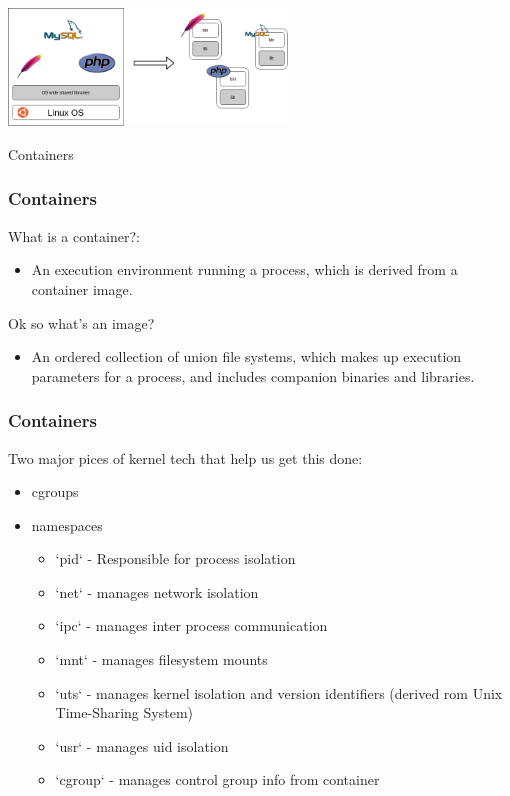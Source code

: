 \documentclass[11pt]{beamer}
\begin{document}
\begin{frame}
  \begin{center}
    \includegraphics[width=280px,keepaspectratio]{BNW}
  \end{center}
\end{frame}

\begin{frame}
  \begin{center}
    Containers
  \end{center}
\end{frame}

\begin{frame}
  \frametitle{Containers}
  What is a container?:
  \begin{itemize}
    \item An execution environment running a process, which is derived from a container image.
  \end{itemize}
  Ok so what's an image?
  \begin{itemize}
    \item An ordered collection of union file systems, which makes up execution parameters for a process, and includes companion binaries and libraries.
  \end{itemize}
\end{frame}

\begin{frame}
  \frametitle{Containers}
  Two major pices of kernel tech that help us get this done:
  \begin{itemize}
    \item cgroups
    \item namespaces
    \begin{itemize}
      \item `pid` - Responsible for process isolation
      \item `net` - manages network isolation
      \item `ipc` - manages inter process communication
      \item `mnt` - manages filesystem mounts
      \item `uts` - manages kernel isolation and version identifiers (derived rom Unix Time-Sharing System)
      \item `usr` - manages uid isolation
      \item `cgroup` - manages control group info from container
    \end{itemize}
  \end{itemize}
\end{frame}
\end{document}
